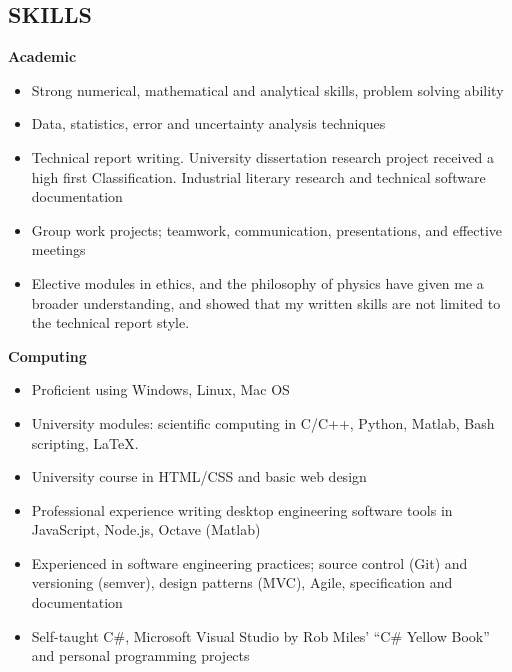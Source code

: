 \documentclass[margin, line, 10pt]{res} %
\begin{document}
\begin{resume}
 
\section{SKILLS}

\textbf{Academic}  


\begin{itemize}
\item Strong numerical, mathematical and analytical skills, problem solving ability 

\item Data, statistics, error and uncertainty analysis techniques

\item Technical report writing. University dissertation research project received a high first Classification. Industrial literary research and technical software documentation

\item Group work projects; teamwork, communication, presentations, and effective meetings

\item Elective modules in ethics, and the philosophy of physics have given me a broader understanding, and showed that my written skills are not limited to the technical report style.
\end{itemize}

\textbf{Computing}  
\begin{itemize} 
\item Proficient using Windows, Linux, Mac OS
\item University modules: scientific computing in C/C++, Python, Matlab, Bash scripting, LaTeX.
\item University course in HTML/CSS and basic web design

\item Professional experience writing desktop engineering software tools in JavaScript, Node.js, Octave (Matlab)

\item Experienced in software engineering practices; source control (Git) and versioning (semver), design patterns (MVC), Agile, specification and documentation

\item Self-taught C\#, Microsoft Visual Studio by Rob Miles' ``C\# Yellow Book'' and personal programming projects
\end{itemize}




\end{resume}
\end{document}
